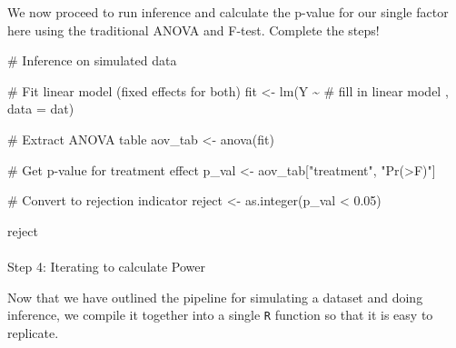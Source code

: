 \documentclass[
  letterpaper,
  DIV=11,
  numbers=noendperiod]{scrartcl}
\makeatletter
\let\oldparagraph\paragraph
\renewcommand{\paragraph}{
    \@ifstar
      \xxxParagraphStar
      \xxxParagraphNoStar
  }
\newcommand{\xxxParagraphStar}[1]{\oldparagraph*{#1}\mbox{}}
\newcommand{\xxxParagraphNoStar}[1]{\oldparagraph{#1}\mbox{}}
\newenvironment{Shaded}{\begin{snugshade}}{\end{snugshade}}
\newcommand{\AttributeTok}[1]{\textcolor[rgb]{0.40,0.45,0.13}{#1}}
\newcommand{\CommentTok}[1]{\textcolor[rgb]{0.37,0.37,0.37}{#1}}
\newcommand{\FloatTok}[1]{\textcolor[rgb]{0.68,0.00,0.00}{#1}}
\newcommand{\FunctionTok}[1]{\textcolor[rgb]{0.28,0.35,0.67}{#1}}
\newcommand{\NormalTok}[1]{\textcolor[rgb]{0.00,0.23,0.31}{#1}}
\newcommand{\OtherTok}[1]{\textcolor[rgb]{0.00,0.23,0.31}{#1}}
\newcommand{\SpecialCharTok}[1]{\textcolor[rgb]{0.37,0.37,0.37}{#1}}
\newcommand{\StringTok}[1]{\textcolor[rgb]{0.13,0.47,0.30}{#1}}
\makeatother
\begin{document}
We now proceed to run inference and calculate the p-value for our single
factor here using the traditional ANOVA and F-test. Complete the steps!

\begin{Shaded}
\begin{Highlighting}[]
\CommentTok{\# Inference on simulated data }

\CommentTok{\# Fit linear model (fixed effects for both)}
\NormalTok{fit }\OtherTok{\textless{}{-}} \FunctionTok{lm}\NormalTok{(Y }\SpecialCharTok{\textasciitilde{}} \CommentTok{\# fill in linear model}
\NormalTok{          , }\AttributeTok{data =}\NormalTok{ dat)}

\CommentTok{\# Extract ANOVA table}
\NormalTok{aov\_tab }\OtherTok{\textless{}{-}} \FunctionTok{anova}\NormalTok{(fit)}

\CommentTok{\# Get p{-}value for treatment effect}
\NormalTok{p\_val }\OtherTok{\textless{}{-}}\NormalTok{ aov\_tab[}\StringTok{"treatment"}\NormalTok{, }\StringTok{"Pr(\textgreater{}F)"}\NormalTok{]}

\CommentTok{\# Convert to rejection indicator}
\NormalTok{reject }\OtherTok{\textless{}{-}} \FunctionTok{as.integer}\NormalTok{(p\_val }\SpecialCharTok{\textless{}} \FloatTok{0.05}\NormalTok{)}

\NormalTok{reject}
\end{Highlighting}
\end{Shaded}

\paragraph{Step 4: Iterating to calculate
Power}\label{step-4-iterating-to-calculate-power}

Now that we have outlined the pipeline for simulating a dataset and
doing inference, we compile it together into a single \texttt{R}
function so that it is easy to replicate.
\end{document}
